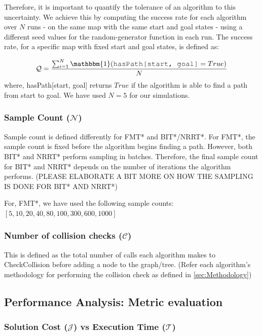 \documentclass{article}
\newcommand*{\varfont}{\fontfamily{pcr}\selectfont}
\begin{document}
Therefore, it is important to quantify the tolerance of an algorithm to this uncertainty. We achieve this by computing the success rate for each algorithm over $N$ runs - on the same map with the same {\varfont start} and {\varfont goal} states - using a different seed values for the random-generator function in each run. The success rate, for a specific map with fixed {\varfont start} and {\varfont goal} states, is defined as:

\begin{align}
    \mathcal{Q} = \frac{\sum_{i=1}^{N} \mathbbm{1}(\text{\varfont hasPath[start, goal]} = True)}{N}  \\
\end{align}
where, {\varfont hasPath[start, goal]} returns $True$ if the algorithm is able to find a path from {\varfont start} to {\varfont goal}. We have used $N=5$ for our simulations.


\subsubsection{Sample Count ($\mathcal{N}$)}

Sample count is defined differently for FMT* and BIT*/NRRT*. For FMT*, the sample count is fixed before the algorithm begins finding a path. However, both BIT* and NRRT* perform sampling in batches. Therefore, the final sample count for BIT* and NRRT* depends on the number of iterations the algorithm performs. (PLEASE ELABORATE A BIT MORE ON HOW THE SAMPLING IS DONE FOR BIT* AND NRRT*)

For, FMT*, we have used the following sample counts: $[5, 10, 20, 40, 80, 100, 300, 600, 1000]$


\subsubsection{Number of collision checks ($\mathcal{C}$)}

This is defined as the total number of calls each algorithm makes to {\varfont CheckCollision} before adding a node to the graph/tree. (Refer each algorithm's methodology for performing the collision check as defined in \ref{sec:Methodology})


\subsection{Performance Analysis: Metric evaluation}

\subsubsection{Solution Cost ($\mathcal{J}$) vs Execution Time ($\mathcal{T}$)}
\end{document}
